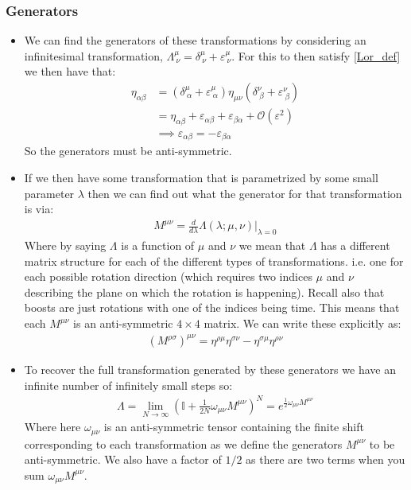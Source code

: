 \documentclass[11pt]{article}
\numberwithin{equation}{section}
\begin{document}
     \subsubsection{Generators}
     \begin{itemize}
       \item We can find the generators of these transformations by considering an infinitesimal transformation, $\Lambda^{\mu}_{~\nu} = \delta^{\mu}_{~\nu} + \varepsilon^{\mu}_{~\nu}$. For this to then satisfy \ref{Lor_def} we then have that:
       \begin{align*}
         \eta_{\alpha\beta} & =  (\delta^{\mu}_{~\alpha} + \varepsilon^{\mu}_{~\alpha})\eta_{\mu\nu}(\delta^{\nu}_{~\beta} + \varepsilon^{\nu}_{~\beta}) \\
         & = \eta_{\alpha\beta} + \varepsilon_{\alpha\beta} + \varepsilon_{\beta\alpha}+ \mathcal{O}(\varepsilon^2) \\
         &\implies   \varepsilon_{\alpha\beta} =-\varepsilon_{\beta\alpha} 
       \end{align*}
       So the generators must be anti-symmetric.

       \item If we then have some transformation that is parametrized by some small parameter $\lambda$ then we can find out what the generator for that transformation is via:
       \begin{align*}
         M^{\mu\nu} = \frac{d}{d\lambda}\Lambda(\lambda;\mu,\nu)\Bigg\vert_{\lambda=0}
       \end{align*}
       Where by saying $\Lambda$ is a function of $\mu$ and $\nu$ we mean that $\Lambda$ has a different matrix structure for each of the different types of transformations. i.e. one for each possible rotation direction (which requires two indices $\mu$ and $\nu$ describing the plane on which the rotation is happening). Recall also that boosts are just rotations with one of the indices being time. This means that each $M^{\mu\nu}$ is an anti-symmetric $4\times4$ matrix. We can write these explicitly as:
       \begin{align}
       \label{M_4x4}
       (M^{\rho\sigma})^{\mu\nu} = \eta^{\rho\mu}\eta^{\sigma\nu}-\eta^{\sigma\mu}\eta^{\rho\nu}
       \end{align}
\item To recover the full transformation generated by these generators we have an infinite number of infinitely small steps so:
       \begin{align*}
         \Lambda = \lim_{N\rightarrow \infty}\left(\mathbb{I}+\frac{1}{2N}\omega_{\mu\nu}M^{\mu\nu}\right)^{N} = e^{\frac{1}{2}\omega_{\mu\nu}M^{\mu\nu}}
       \end{align*}
       Where here $\omega_{\mu\nu}$ is an anti-symmetric tensor containing the finite shift corresponding to each transformation as we define the generators $M^{\mu\nu}$ to be anti-symmetric. We also have a factor of $1/2$ as there are two terms when you sum $\omega_{\mu\nu}M^{\mu\nu}$.


\end{itemize}
\end{document}
